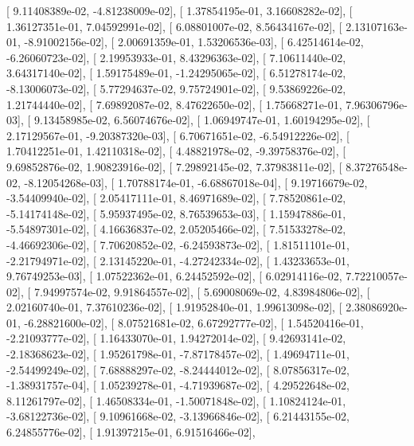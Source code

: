 \documentclass{article}
\begin{document}
       [  9.11408389e-02,  -4.81238009e-02],
       [  1.37854195e-01,   3.16608282e-02],
       [  1.36127351e-01,   7.04592991e-02],
       [  6.08801007e-02,   8.56434167e-02],
       [  2.13107163e-01,  -8.91002156e-02],
       [  2.00691359e-01,   1.53206536e-03],
       [  6.42514614e-02,  -6.26060723e-02],
       [  2.19953933e-01,   8.43296363e-02],
       [  7.10611440e-02,   3.64317140e-02],
       [  1.59175489e-01,  -1.24295065e-02],
       [  6.51278174e-02,  -8.13006073e-02],
       [  5.77294637e-02,   9.75724901e-02],
       [  9.53869226e-02,   1.21744440e-02],
       [  7.69892087e-02,   8.47622650e-02],
       [  1.75668271e-01,   7.96306796e-03],
       [  9.13458985e-02,   6.56074676e-02],
       [  1.06949747e-01,   1.60194295e-02],
       [  2.17129567e-01,  -9.20387320e-03],
       [  6.70671651e-02,  -6.54912226e-02],
       [  1.70412251e-01,   1.42110318e-02],
       [  4.48821978e-02,  -9.39758376e-02],
       [  9.69852876e-02,   1.90823916e-02],
       [  7.29892145e-02,   7.37983811e-02],
       [  8.37276548e-02,  -8.12054268e-03],
       [  1.70788174e-01,  -6.68867018e-04],
       [  9.19716679e-02,  -3.54409940e-02],
       [  2.05417111e-01,   8.46971689e-02],
       [  7.78520861e-02,  -5.14174148e-02],
       [  5.95937495e-02,   8.76539653e-03],
       [  1.15947886e-01,  -5.54897301e-02],
       [  4.16636837e-02,   2.05205466e-02],
       [  7.51533278e-02,  -4.46692306e-02],
       [  7.70620852e-02,  -6.24593873e-02],
       [  1.81511101e-01,  -2.21794971e-02],
       [  2.13145220e-01,  -4.27242334e-02],
       [  1.43233653e-01,   9.76749253e-03],
       [  1.07522362e-01,   6.24452592e-02],
       [  6.02914116e-02,   7.72210057e-02],
       [  7.94997574e-02,   9.91864557e-02],
       [  5.69008069e-02,   4.83984806e-02],
       [  2.02160740e-01,   7.37610236e-02],
       [  1.91952840e-01,   1.99613098e-02],
       [  2.38086920e-01,  -6.28821600e-02],
       [  8.07521681e-02,   6.67292777e-02],
       [  1.54520416e-01,  -2.21093777e-02],
       [  1.16433070e-01,   1.94272014e-02],
       [  9.42693141e-02,  -2.18368623e-02],
       [  1.95261798e-01,  -7.87178457e-02],
       [  1.49694711e-01,  -2.54499249e-02],
       [  7.68888297e-02,  -8.24444012e-02],
       [  8.07856317e-02,  -1.38931757e-04],
       [  1.05239278e-01,  -4.71939687e-02],
       [  4.29522648e-02,   8.11261797e-02],
       [  1.46508334e-01,  -1.50071848e-02],
       [  1.10824124e-01,  -3.68122736e-02],
       [  9.10961668e-02,  -3.13966846e-02],
       [  6.21443155e-02,   6.24855776e-02],
       [  1.91397215e-01,   6.91516466e-02],
\end{document}
